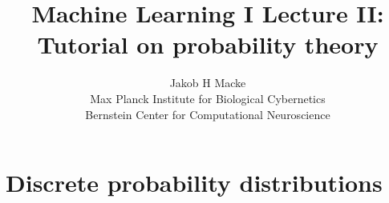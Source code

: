 \documentclass[10pt, handout]{beamer}
\begin{document}
\title{Machine Learning I Lecture II:\\ Tutorial on probability theory}   
\author{Jakob H Macke\\ Max Planck Institute for Biological Cybernetics\\ Bernstein Center for Computational Neuroscience} 

\frame{\titlepage} 





\section{Discrete probability distributions} 
\end{document}
